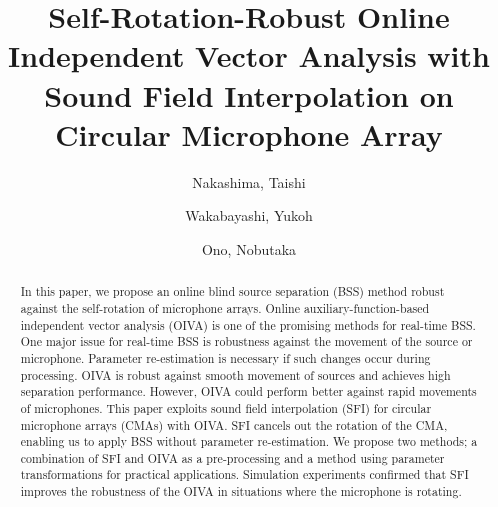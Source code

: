 \documentclass[sip,biber]{now-journal}
\title{Self-Rotation-Robust Online Independent Vector Analysis with\\Sound Field Interpolation on Circular Microphone Array}
\author{Nakashima, Taishi}
\affil{Tokyo Metropolitan University, Tokyo, Japan}
\author{Wakabayashi, Yukoh}
\affil{Toyohashi University of Technology, Aichi, Japan}
\author[1]{Ono, Nobutaka}
\begin{document}
\begin{abstract}
  In this paper, we propose an online blind source separation (BSS) method robust against the self-rotation of microphone arrays.
  Online auxiliary-function-based independent vector analysis (OIVA) is one of the promising methods for real-time BSS.
  One major issue for real-time BSS is robustness against the movement of the source or microphone.
  Parameter re-estimation is necessary if such changes occur during processing.
  OIVA is robust against smooth movement of sources and achieves high separation performance.
  However, OIVA could perform better against rapid movements of microphones.
  This paper exploits sound field interpolation (SFI) for circular microphone arrays (CMAs) with OIVA.
  SFI cancels out the rotation of the CMA, enabling us to apply BSS without parameter re-estimation.
  We propose two methods; a combination of SFI and OIVA as a pre-processing and a method using parameter transformations for practical applications.
  Simulation experiments confirmed that SFI improves the robustness of the OIVA in situations where the microphone is rotating.
\end{abstract}
\end{document}

